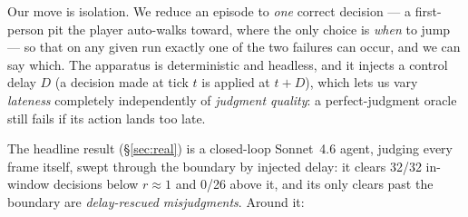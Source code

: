\documentclass[11pt]{article}
\begin{document}
Our move is isolation. We reduce an episode to \emph{one} correct decision --- a
first-person pit the player auto-walks toward, where the only choice is
\emph{when} to jump --- so that on any given run exactly one of the two failures
can occur, and we can say which. The apparatus is deterministic and headless,
and it injects a control delay $D$ (a decision made at tick $t$ is applied at
$t{+}D$), which lets us vary \emph{lateness} completely independently of
\emph{judgment quality}: a perfect-judgment oracle still fails if its action
lands too late.

The headline result (\S\ref{sec:real}) is a closed-loop Sonnet~4.6 agent,
judging every frame itself, swept through the boundary by injected delay: it
clears 32/32 in-window decisions below $r \approx 1$ and 0/26 above it, and its
only clears past the boundary are \emph{delay-rescued misjudgments}. Around
it:
\end{document}
